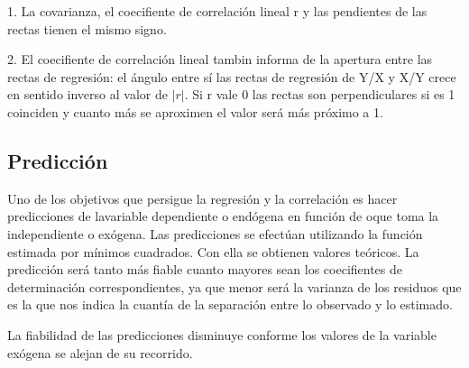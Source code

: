 \documentclass{article}
\begin{document}
1. La covarianza, el coecifiente de correlación lineal r y las pendientes de las rectas tienen el mismo signo.


2. El coecifiente de correlación lineal tambin informa de la apertura entre las rectas de regresión: el ángulo entre sí las rectas de regresión de Y/X y X/Y crece en sentido inverso al valor de $ |r| $. Si r vale 0 las rectas son perpendiculares si es 1 coinciden y cuanto más se aproximen el valor será más próximo a 1.

\subsection{Predicción}

Uno de los objetivos que persigue la regresión y la correlación es hacer predicciones de lavariable dependiente o endógena en función de oque toma la independiente o exógena. Las predicciones se efectúan utilizando la función estimada por mínimos cuadrados. Con ella se obtienen valores teóricos. La predicción será tanto más fiable cuanto mayores sean los coecifientes de determinación correspondientes, ya que menor será la varianza de los residuos que es la que nos indica la cuantía de la separación entre lo observado y lo estimado.

La fiabilidad de las predicciones disminuye conforme los valores de la variable exógena se alejan de su recorrido.

 
\end{document}
